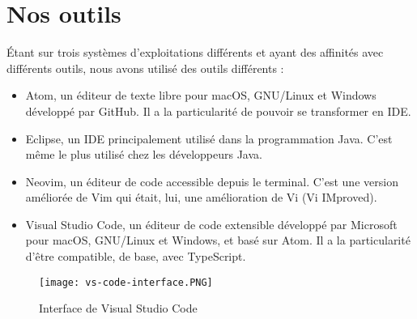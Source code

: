 \section{Nos outils}
	Étant sur trois systèmes d'exploitations différents et ayant des affinités avec différents outils, nous avons utilisé des outils différents :
	\begin{itemize}
		\item Atom, un éditeur de texte libre pour macOS, GNU/Linux et Windows développé par GitHub.
		Il a la particularité de pouvoir se transformer en IDE.
		\item Eclipse, un IDE principalement utilisé dans la programmation Java. C'est même le plus utilisé chez les développeurs Java.
		\item Neovim, un éditeur de code accessible depuis le terminal. C'est une version améliorée de Vim qui était, lui, une amélioration de Vi (Vi IMproved).
		\item Visual Studio Code, un éditeur de code extensible développé par Microsoft pour macOS, GNU/Linux et Windows, et basé sur Atom.
		Il a la particularité d'être compatible, de base, avec TypeScript.
	\end{itemize}

\begin{figure}[ht]
	\centering
	\texttt{[image: vs-code-interface.PNG]}
	\caption{Interface de Visual Studio Code}
\end{figure}
